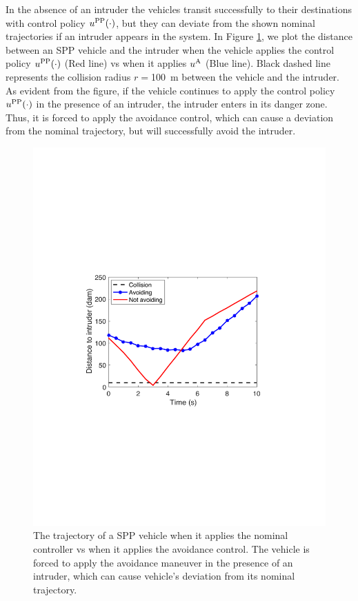 In the absence of an intruder the vehicles transit successfully to their destinations with control policy $u^{\text{PP}}(\cdot)$, but they can deviate from the shown nominal trajectories if an intruder appears in the system. In Figure \ref{fig:trajComparison}, we plot the distance between an SPP vehicle and the intruder when the vehicle applies the control policy $u^{\text{PP}}(\cdot)$ (Red line) vs when it applies ${u^{\text{A}}}$ (Blue line). Black dashed line represents the collision radius $r=$\SI{100}{\m} between the vehicle and the intruder. As evident from the figure, if the vehicle continues to apply the control policy $u^{\text{PP}}(\cdot)$ in the presence of an intruder, the intruder enters in its danger zone. Thus, it is forced to apply the avoidance control, which can cause a deviation from the nominal trajectory, but will successfully avoid the intruder.
\begin{figure}[H]
  \centering
  \includegraphics[width=\columnwidth]{"figs/simulateIntruder"}
  \caption{The trajectory of a SPP vehicle when it applies the nominal controller vs when it applies the avoidance control. The vehicle is forced to apply the avoidance maneuver in the presence of an intruder, which can cause vehicle's deviation from its nominal trajectory.}
  \label{fig:trajComparison}
\end{figure}


